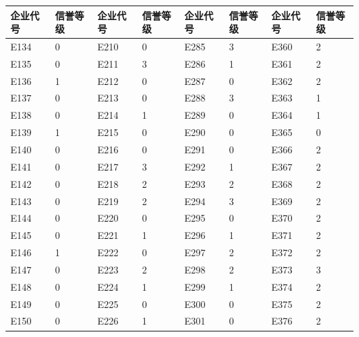 \documentclass[UTF8]{ctexart}
\begin{document}
\begin{table}[H]
	\centering
	\begin{tabular}{|l|l|l|l|l|l|l|l|}
		\hline
		企业代号 & 信誉等级 & 企业代号 & 信誉等级 & 企业代号 & 信誉等级 & 企业代号 & 信誉等级 \\ \hline
		E134     & 0        & E210     & 0        & E285     & 3        & E360     & 2        \\ \hline
		E135     & 0        & E211     & 3        & E286     & 1        & E361     & 2        \\ \hline
		E136     & 1        & E212     & 0        & E287     & 0        & E362     & 2        \\ \hline
		E137     & 0        & E213     & 0        & E288     & 3        & E363     & 1        \\ \hline
		E138     & 0        & E214     & 1        & E289     & 0        & E364     & 1        \\ \hline
		E139     & 1        & E215     & 0        & E290     & 0        & E365     & 0        \\ \hline
		E140     & 0        & E216     & 0        & E291     & 0        & E366     & 2        \\ \hline
		E141     & 0        & E217     & 3        & E292     & 1        & E367     & 2        \\ \hline
		E142     & 0        & E218     & 2        & E293     & 2        & E368     & 2        \\ \hline
		E143     & 0        & E219     & 2        & E294     & 3        & E369     & 2        \\ \hline
		E144     & 0        & E220     & 0        & E295     & 0        & E370     & 2        \\ \hline
		E145     & 0        & E221     & 1        & E296     & 1        & E371     & 2        \\ \hline
		E146     & 1        & E222     & 0        & E297     & 2        & E372     & 2        \\ \hline
		E147     & 0        & E223     & 2        & E298     & 2        & E373     & 3        \\ \hline
		E148     & 0        & E224     & 1        & E299     & 1        & E374     & 2        \\ \hline
		E149     & 0        & E225     & 0        & E300     & 0        & E375     & 2        \\ \hline
		E150     & 0        & E226     & 1        & E301     & 0        & E376     & 2        \\ \hline

\end{tabular}
\end{table}
\end{document}
